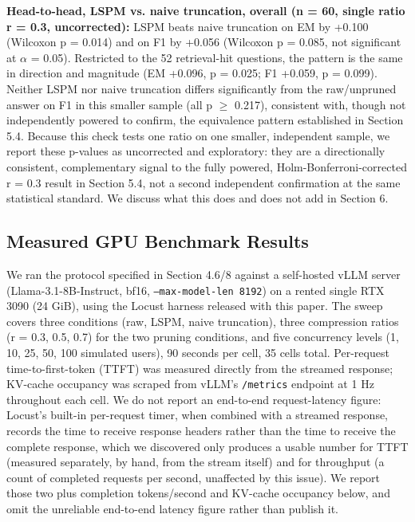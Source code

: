 \textbf{Head-to-head, LSPM vs. naive truncation, overall (n = 60, single ratio r = 0.3, uncorrected):} LSPM beats naive truncation on EM by +0.100 (Wilcoxon p = 0.014) and on F1 by +0.056 (Wilcoxon p = 0.085, not significant at $\alpha$ = 0.05). Restricted to the 52 retrieval-hit questions, the pattern is the same in direction and magnitude (EM +0.096, p = 0.025; F1 +0.059, p = 0.099). Neither LSPM nor naive truncation differs significantly from the raw/unpruned answer on F1 in this smaller sample (all p $\geq$ 0.217), consistent with, though not independently powered to confirm, the equivalence pattern established in Section 5.4. Because this check tests one ratio on one smaller, independent sample, we report these p-values as uncorrected and exploratory: they are a directionally consistent, complementary signal to the fully powered, Holm-Bonferroni-corrected r = 0.3 result in Section 5.4, not a second independent confirmation at the same statistical standard. We discuss what this does and does not add in Section 6.

\subsection{Measured GPU Benchmark Results}
We ran the protocol specified in Section 4.6/8 against a self-hosted vLLM server (Llama-3.1-8B-Instruct, bf16, \texttt{--max-model-len 8192}) on a rented single RTX 3090 (24 GiB), using the Locust harness released with this paper. The sweep covers three conditions (raw, LSPM, naive truncation), three compression ratios (r = 0.3, 0.5, 0.7) for the two pruning conditions, and five concurrency levels (1, 10, 25, 50, 100 simulated users), 90 seconds per cell, 35 cells total. Per-request time-to-first-token (TTFT) was measured directly from the streamed response; KV-cache occupancy was scraped from vLLM's \texttt{/metrics} endpoint at 1 Hz throughout each cell. We do not report an end-to-end request-latency figure: Locust's built-in per-request timer, when combined with a streamed response, records the time to receive response headers rather than the time to receive the complete response, which we discovered only produces a usable number for TTFT (measured separately, by hand, from the stream itself) and for throughput (a count of completed requests per second, unaffected by this issue). We report those two plus completion tokens/second and KV-cache occupancy below, and omit the unreliable end-to-end latency figure rather than publish it.

